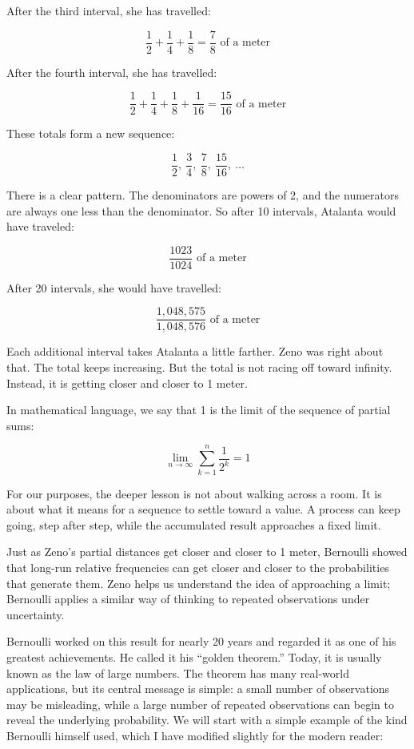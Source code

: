 \documentclass[
  letterpaper,
  DIV=11,
  numbers=noendperiod]{scrreprt}
\begin{document}
\begin{tcolorbox}
After the third interval, she has travelled:

\[
\frac{1}{2} + \frac{1}{4} + \frac{1}{8} = \frac{7}{8} \text{ of a meter}
\]

After the fourth interval, she has travelled:

\[
\frac{1}{2} + \frac{1}{4} + \frac{1}{8} + \frac{1}{16} = \frac{15}{16} \text{ of a meter}
\]

These totals form a new sequence:

\[
\frac{1}{2},\ \frac{3}{4},\ \frac{7}{8},\ \frac{15}{16},\ \ldots
\]

There is a clear pattern. The denominators are powers of 2, and the
numerators are always one less than the denominator. So after 10
intervals, Atalanta would have traveled:

\[
\frac{1023}{1024} \text{ of a meter}
\]

After 20 intervals, she would have travelled:

\[
\frac{1{,}048{,}575}{1{,}048{,}576} \text{ of a meter}
\]

Each additional interval takes Atalanta a little farther. Zeno was right
about that. The total keeps increasing. But the total is not racing off
toward infinity. Instead, it is getting closer and closer to 1 meter.

In mathematical language, we say that 1 is the limit of the sequence of
partial sums:

\[
\lim_{n \to \infty}
\sum_{k = 1}^{n} \frac{1}{2^k}
= 1
\]

For our purposes, the deeper lesson is not about walking across a room.
It is about what it means for a sequence to settle toward a value. A
process can keep going, step after step, while the accumulated result
approaches a fixed limit.

\end{tcolorbox}

Just as Zeno's partial distances get closer and closer to 1 meter,
Bernoulli showed that long-run relative frequencies can get closer and
closer to the probabilities that generate them. Zeno helps us understand
the idea of approaching a limit; Bernoulli applies a similar way of
thinking to repeated observations under uncertainty.

Bernoulli worked on this result for nearly 20 years and regarded it as
one of his greatest achievements. He called it his ``golden theorem.''
Today, it is usually known as the law of large numbers. The theorem has
many real-world applications, but its central message is simple: a small
number of observations may be misleading, while a large number of
repeated observations can begin to reveal the underlying probability. We
will start with a simple example of the kind Bernoulli himself used,
which I have modified slightly for the modern reader:
\end{document}
